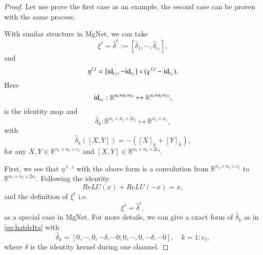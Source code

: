 \begin{proof}
Let use prove the first case as an example, 
the second case can be proven with the same process.

With similar structure in MgNet, we can take
\begin{equation}
\label{xi-cnn1}
\xi^{\ell}= \hat \delta^\ell :=  [\hat \delta_1, \cdots, \hat \delta_{{c_\ell}}],
\end{equation}
and 
\begin{equation}
\label{eta-ell}
\eta^{\ell,i} = [{\rm id}_{c_\ell}, -{\rm id}_{c_\ell}] \circ (\chi^{\ell,i} - {\rm id}_{c_\ell}).
\end{equation}
Here 
\begin{equation}
{\rm id}_{c_\ell}: \mathbb{R}^{n_\ell \times n_\ell \times c_\ell} 
\mapsto \mathbb{R}^{n_\ell \times n_\ell \times c_\ell},
\end{equation}
is the identity map and 
\begin{equation}
\hat \delta_k :  \mathbb{R}^{n_\ell \times n_\ell \times 2c_\ell} 
\mapsto \mathbb{R}^{n_\ell \times n_\ell},
\end{equation}
with 
\begin{equation}\label{eq:hatdelta}
\hat \delta_k([X ,Y]) = -([X]_k + [Y]_k),
\end{equation}
for any $X, Y \in \mathbb{R}^{n_\ell \times n_\ell \times c_\ell}$ 
and $[X,Y] \in \mathbb{R}^{n_\ell \times n_\ell \times 2c_\ell} $.


	First, we see that $\eta^{\ell,i}$ with the above 
	form is a convolution from $\mathbb{R}^{n_\ell \times n_\ell \times c_\ell}$
	to  $\mathbb{R}^{n_\ell \times n_\ell \times 2c_\ell}$.
	Following the identity
	\begin{equation}
	ReLU(x) + ReLU(-x) = x,
	\end{equation}
	and the definition of $\xi^{\ell}$ i.e. 
	\begin{equation}
	\xi^{\ell} = \hat \delta^\ell,
	\end{equation}
	as a special case in MgNet. 
	For more details, we can give a exact form of 
	$\hat \delta_k$ as in \eqref{eq:hatdelta} with
	\begin{equation}
	\hat \delta_k = [0, \cdots,0, -\delta, \cdots 0;  0, \cdots,0, -\delta, \cdots 0],  \quad k = 1:{c_\ell},
	\end{equation}
	where $\delta$ is the identity kernel during one channel.
	

\end{proof}
